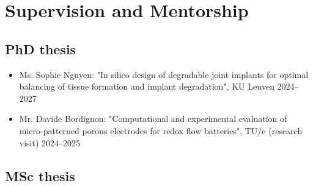 \documentclass{cv}
\begin{document}

\section{Supervision and Mentorship}

\subsection{PhD thesis}

\begin{itemize}[itemsep=-0.2ex]
\item
Ms. Sophie Nguyen: "In silico design of degradable joint implants for optimal balancing of tissue formation and implant degradation", KU Leuven \hfill 2024--2027
\item
Mr. Davide Bordignon: "Computational and experimental evaluation of micro-patterned porous electrodes for redox flow batteries", TU/e (research visit) \hfill 2024--2025
\end{itemize}

\subsection{MSc thesis}
\end{document}
